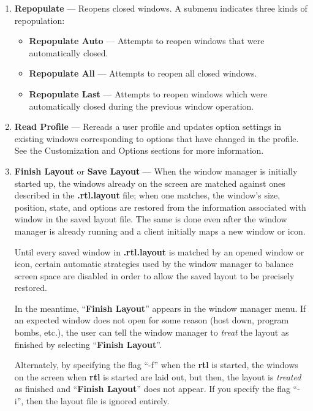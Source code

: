 \begin{enumerate}
\item 
{\bf Repopulate} --- Reopens closed windows.  A submenu indicates three
kinds of repopulation:

\begin{itemize}
\item {\bf Repopulate Auto} --- Attempts to reopen windows that were automatically
closed.

\item {\bf Repopulate All} --- Attempts to reopen all closed windows.

\item {\bf Repopulate Last} --- Attempts to reopen windows which were
automatically closed during the previous window operation.
\end{itemize}


\item {\bf Read Profile} --- Rereads a user profile and updates option
settings in existing windows corresponding to options that have changed
in the profile.  See the Customization and Options sections for more
information.

\item 
{\bf Finish Layout} or {\bf Save Layout} --- When the window manager is
initially started up, the windows already on the screen are matched
against ones described in the {\bf .rtl.layout} file; when one matches, the
window's size, position, state, and options are restored from the
information associated with window in the saved layout file.
The same is done even after the window manager is already running and a
client initially maps a new window or icon.

Until every saved window in
{\bf .rtl.layout} is matched by an opened window or icon,
certain automatic strategies used by the window manager to balance screen
space are disabled in order to allow the saved layout to be precisely
restored.

In the meantime, ``{\bf Finish Layout}'' appears in the window manager menu.
If an expected window does not open for some reason (host down,
program bombs, etc.), the user can tell the window manager to {\it treat}
the layout as finished by selecting ``{\bf Finish Layout}''.

Alternately, by specifying the flag ``-f''  when the {\bf rtl} is
started, the windows on the screen when {\bf rtl} is started are laid out,
but then, the layout is {\it treated} as finished and ``{\bf Finish Layout}''
does not appear.  If you specify the flag ``-i'', then the layout file
is ignored entirely.


\end{enumerate}
